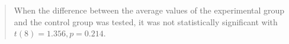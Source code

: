 \begin{quote}
	When the difference between the average values of the experimental group and the control group was tested, it was not statistically significant with $t(8)=1.356, p=0.214$.
\end{quote}
